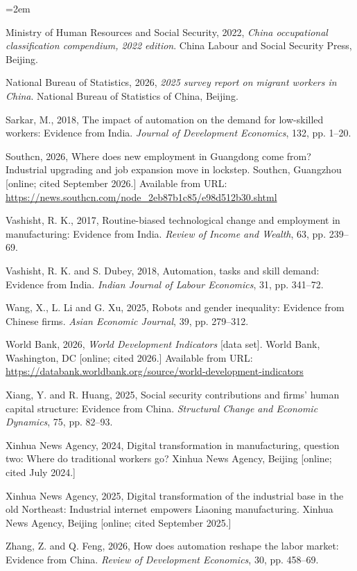 \documentclass[12pt]{article}
\begin{document}
\begin{list}{}{\leftmargin=2em}
\item Ministry of Human Resources and Social Security, 2022, \emph{China occupational classification compendium, 2022 edition}. China Labour and Social Security Press, Beijing.
\item National Bureau of Statistics, 2026, \emph{2025 survey report on migrant workers in China}. National Bureau of Statistics of China, Beijing.
\item Sarkar, M., 2018, The impact of automation on the demand for low-skilled workers: Evidence from India. \emph{Journal of Development Economics}, 132, pp. 1--20.
\item Southcn, 2026, Where does new employment in Guangdong come from? Industrial upgrading and job expansion move in lockstep. Southcn, Guangzhou [online; cited September 2026.] Available from URL: \url{https://news.southcn.com/node_2eb87b1c85/e98d512b30.shtml}
\item Vashisht, R. K., 2017, Routine-biased technological change and employment in manufacturing: Evidence from India. \emph{Review of Income and Wealth}, 63, pp. 239--69.
\item Vashisht, R. K. and S. Dubey, 2018, Automation, tasks and skill demand: Evidence from India. \emph{Indian Journal of Labour Economics}, 31, pp. 341--72.
\item Wang, X., L. Li and G. Xu, 2025, Robots and gender inequality: Evidence from Chinese firms. \emph{Asian Economic Journal}, 39, pp. 279--312.
\item World Bank, 2026, \emph{World Development Indicators} [data set]. World Bank, Washington, DC [online; cited 2026.] Available from URL: \url{https://databank.worldbank.org/source/world-development-indicators}
\item Xiang, Y. and R. Huang, 2025, Social security contributions and firms' human capital structure: Evidence from China. \emph{Structural Change and Economic Dynamics}, 75, pp. 82--93.
\item Xinhua News Agency, 2024, Digital transformation in manufacturing, question two: Where do traditional workers go? Xinhua News Agency, Beijing [online; cited July 2024.]
\item Xinhua News Agency, 2025, Digital transformation of the industrial base in the old Northeast: Industrial internet empowers Liaoning manufacturing. Xinhua News Agency, Beijing [online; cited September 2025.]
\item Zhang, Z. and Q. Feng, 2026, How does automation reshape the labor market: Evidence from China. \emph{Review of Development Economics}, 30, pp. 458--69.

\end{list}
\end{document}
